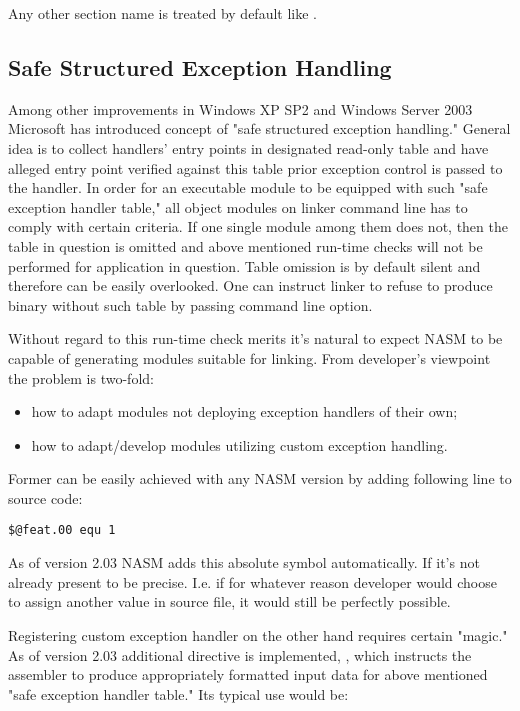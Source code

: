 Any other section name is treated by default like .

\subsection{ Safe Structured Exception Handling}
\label{subsec:win32safeseh}

Among other improvements in Windows XP SP2 and Windows Server 2003
Microsoft has introduced concept of "safe structured exception
handling." General idea is to collect handlers' entry points in
designated read-only table and have alleged entry point verified
against this table prior exception control is passed to the handler. In
order for an executable module to be equipped with such "safe exception
handler table," all object modules on linker command line has to comply
with certain criteria. If one single module among them does not, then
the table in question is omitted and above mentioned run-time checks
will not be performed for application in question. Table omission is by
default silent and therefore can be easily overlooked. One can instruct
linker to refuse to produce binary without such table by passing
 command line option.

Without regard to this run-time check merits it's natural to expect
NASM to be capable of generating modules suitable for 
linking. From developer's viewpoint the problem is two-fold:

\begin{itemize}
    \item{how to adapt modules not deploying exception handlers of their own;}
    \item{how to adapt/develop modules utilizing custom exception handling.}
\end{itemize}

Former can be easily achieved with any NASM version by adding following
line to source code:

\begin{lstlisting}
$@feat.00 equ 1
\end{lstlisting}

As of version 2.03 NASM adds this absolute symbol automatically. If
it's not already present to be precise. I.e. if for whatever reason
developer would choose to assign another value in source file, it would
still be perfectly possible.

Registering custom exception handler on the other hand requires certain
"magic." As of version 2.03 additional directive is implemented,
, which instructs the assembler to produce appropriately
formatted input data for above mentioned "safe exception handler
table." Its typical use would be:

